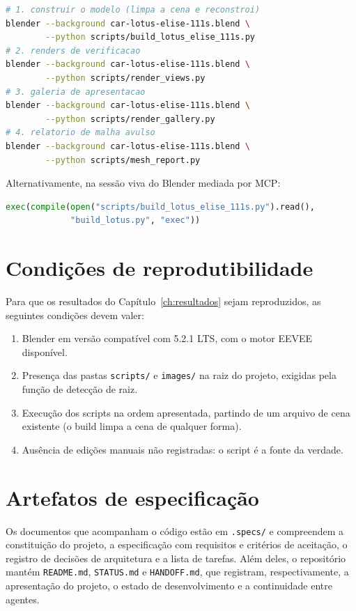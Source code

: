 \begin{lstlisting}[language=bash]
# 1. construir o modelo (limpa a cena e reconstroi)
blender --background car-lotus-elise-111s.blend \
        --python scripts/build_lotus_elise_111s.py
# 2. renders de verificacao
blender --background car-lotus-elise-111s.blend \
        --python scripts/render_views.py
# 3. galeria de apresentacao
blender --background car-lotus-elise-111s.blend \
        --python scripts/render_gallery.py
# 4. relatorio de malha avulso
blender --background car-lotus-elise-111s.blend \
        --python scripts/mesh_report.py
\end{lstlisting}

Alternativamente, na sess\~ao viva do Blender mediada por MCP:

\begin{lstlisting}[language=Python]
exec(compile(open("scripts/build_lotus_elise_111s.py").read(),
             "build_lotus.py", "exec"))
\end{lstlisting}

\section{Condi{\c{c}}\~oes de reprodutibilidade}

Para que os resultados do Cap\'itulo~\ref{ch:resultados} sejam reproduzidos, as seguintes
condi{\c{c}}\~oes devem valer:

\begin{enumerate}[label=\arabic*),leftmargin=1.4cm]
  \item Blender em vers\~ao compat\'ivel com 5.2.1 LTS, com o motor EEVEE dispon\'ivel.
  \item Presen{\c{c}}a das pastas \texttt{scripts/} e \texttt{images/} na raiz do projeto,
        exigidas pela fun{\c{c}}\~ao de detec{\c{c}}\~ao de raiz.
  \item Execu{\c{c}}\~ao dos scripts na ordem apresentada, partindo de um arquivo de cena
        existente (o build limpa a cena de qualquer forma).
  \item Aus\^encia de edi{\c{c}}\~oes manuais n\~ao registradas: o script \'e a fonte da
        verdade.
\end{enumerate}

\section{Artefatos de especifica{\c{c}}\~ao}

Os documentos que acompanham o c\'odigo est\~ao em \texttt{.specs/} e compreendem a
constitui{\c{c}}\~ao do projeto, a especifica{\c{c}}\~ao com requisitos e crit\'erios de
aceita{\c{c}}\~ao, o registro de decis\~oes de arquitetura e a lista de tarefas. Al\'em deles,
o reposit\'orio mant\'em \texttt{README.md}, \texttt{STATUS.md} e \texttt{HANDOFF.md}, que
registram, respectivamente, a apresenta{\c{c}}\~ao do projeto, o estado de desenvolvimento e a
continuidade entre agentes.

